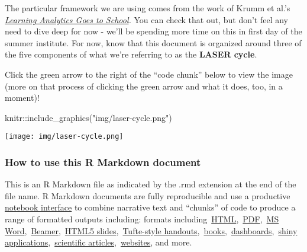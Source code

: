 \documentclass[
]{article}
\newenvironment{Shaded}{\begin{snugshade}}{\end{snugshade}}
\newcommand{\FunctionTok}[1]{\textcolor[rgb]{0.00,0.00,0.00}{#1}}
\newcommand{\NormalTok}[1]{#1}
\newcommand{\SpecialCharTok}[1]{\textcolor[rgb]{0.00,0.00,0.00}{#1}}
\newcommand{\StringTok}[1]{\textcolor[rgb]{0.31,0.60,0.02}{#1}}
\begin{document}
The particular framework we are using comes from the work of Krumm et
al.'s
\href{https://github.com/laser-institute/essential-readings/blob/main/laser-orientation/Learning\%20Analytics\%20Goes\%20to\%20School.pdf}{\emph{Learning
Analytics Goes to School}}\emph{.} You can check that out, but don't
feel any need to dive deep for now - we'll be spending more time on this
in first day of the summer institute. For now, know that this document
is organized around three of the five components of what we're referring
to as the \textbf{LASER cycle}.

Click the green arrow to the right of the ``code chunk'' below to view
the image (more on that process of clicking the green arrow and what it
does, too, in a moment)!

\begin{Shaded}
\begin{Highlighting}[]
\NormalTok{knitr}\SpecialCharTok{::}\FunctionTok{include\_graphics}\NormalTok{(}\StringTok{"img/laser{-}cycle.png"}\NormalTok{)}
\end{Highlighting}
\end{Shaded}

\texttt{[image: img/laser-cycle.png]}

\hypertarget{how-to-use-this-r-markdown-document}{%
\subsubsection{How to use this R Markdown
document}\label{how-to-use-this-r-markdown-document}}

This is an R Markdown file as indicated by the .rmd extension at the end
of the file name. R Markdown documents are fully reproducible and use a
productive
\href{https://bookdown.org/yihui/rmarkdown/notebook.html}{notebook
interface} to combine narrative text and ``chunks'' of code to produce a
range of formatted outputs including: formats
including~\href{https://bookdown.org/yihui/rmarkdown/html-document.html}{HTML},~\href{https://bookdown.org/yihui/rmarkdown/pdf-document.html}{PDF},~\href{https://bookdown.org/yihui/rmarkdown/word-document.html}{MS
Word},~\href{https://bookdown.org/yihui/rmarkdown/beamer-presentation.html}{Beamer},~\href{https://bookdown.org/yihui/rmarkdown/ioslides-presentation.html}{HTML5
slides},~\href{https://bookdown.org/yihui/rmarkdown/tufte-handouts.html}{Tufte-style
handouts},~\href{https://bookdown.org/}{books},~\href{https://rmarkdown.rstudio.com/flexdashboard/}{dashboards},~\href{https://bookdown.org/yihui/rmarkdown/shiny-documents.html}{shiny
applications},~\href{https://github.com/rstudio/rticles}{scientific
articles},~\href{https://bookdown.org/yihui/rmarkdown/rmarkdown-site.html}{websites},
and more.
\end{document}
